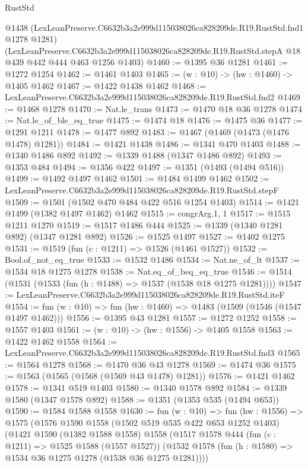 \begin{lexlean}{RustStd}
\begin{coremodule}
    @1438
    (LexLeanPreserve.C6632b3a2e999d115038026ca828209de.R19.RustStd.fnd1 @1278 @1281)
    (LexLeanPreserve.C6632b3a2e999d115038026ca828209de.R19.RustStd.stepA
      @18
      @439
      @442
      @444
      @463
      @1256
      @1403)
@1460 := @1395 @36 @1281
@1461 := @1272 @1254
@1462 := @1461 @1403
@1465 := (w : @10) -> (hw : @1460) -> @1405 @1462
@1467 := @1422 @1438 @1462
@1468 := LexLeanPreserve.C6632b3a2e999d115038026ca828209de.R19.RustStd.fnd2
@1469 := @1468 @1278
@1470 := Nat.le_trans
@1473 := @1470 @18 @36 @1278
@1474 := Nat.le_of_ble_eq_true
@1475 := @1474 @18
@1476 := @1475 @36
@1477 := @1291 @1211
@1478 := @1477 @892
@1483 := @1467 (@1469 (@1473 (@1476 @1478) @1281))
@1484 := @1421 @1438
@1486 := @1341 @470 @1403
@1488 := @1340 @1486 @892
@1492 := @1339 @1488 (@1347 @1486 @892)
@1493 := @1353 @484
@1494 := @1356 @422
@1497 := @1351 (@1493 (@1494 @516))
@1499 := @1492 @1497 @1462
@1501 := @1484 @1499 @1462
@1502 := LexLeanPreserve.C6632b3a2e999d115038026ca828209de.R19.RustStd.stepF
@1509 := @1501 (@1502 @470 @484 @422 @516 @1254 @1403)
@1514 := @1421 @1499 (@1382 @1497 @1462) @1462
@1515 := congrArg.{1, 1}
@1517 := @1515 @1211 @1270
@1519 := @1517 @1486 @444
@1525 := @1339 (@1340 @1281 @892) (@1347 @1281 @892)
@1526 := @1525 @1497
@1527 := @1402 @1275
@1531 := @1519 (fun (c : @1211) => @1526 (@1461 @1527))
@1532 := Bool.of_not_eq_true
@1533 := @1532 @1486
@1534 := Nat.ne_of_lt
@1537 := @1534 @18 @1275 @1278
@1538 := Nat.eq_of_beq_eq_true
@1546 := @1514 (@1531 (@1533 (fun (h : @1488) => @1537 (@1538 @18 @1275 @1281))))
@1547 := LexLeanPreserve.C6632b3a2e999d115038026ca828209de.R19.RustStd.iteF
@1554 := fun (w : @10) => fun (hw : @1460) => @1483 (@1509 (@1546 (@1547 @1497 @1462)))
@1556 := @1395 @43 @1281
@1557 := @1272 @1252
@1558 := @1557 @1403
@1561 := (w : @10) -> (hw : @1556) -> @1405 @1558
@1563 := @1422 @1462 @1558
@1564 := LexLeanPreserve.C6632b3a2e999d115038026ca828209de.R19.RustStd.fnd3
@1565 := @1564 @1278
@1568 := @1470 @36 @43 @1278
@1569 := @1474 @36
@1575 := @1563 (@1565 (@1568 (@1569 @43 @1478) @1281))
@1576 := @1421 @1462
@1578 := @1341 @519 @1403
@1580 := @1340 @1578 @892
@1584 := @1339 @1580 (@1347 @1578 @892)
@1588 := @1351 (@1353 @535 (@1494 @653))
@1590 := @1584 @1588 @1558
@1630 := fun (w : @10) =>
  fun (hw : @1556) =>
  @1575
    (@1576
      @1590
      @1558
      (@1502 @519 @535 @422 @653 @1252 @1403)
      (@1421
        @1590
        (@1382 @1588 @1558)
        @1558
        (@1517
          @1578
          @444
          (fun (c : @1211) => @1525 @1588 (@1557 @1527))
          (@1532 @1578 (fun (h : @1580) => @1534 @36 @1275 @1278 (@1538 @36 @1275 @1281))))

\end{coremodule}
\end{lexlean}
